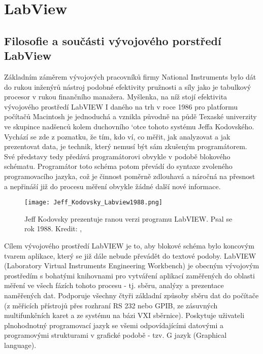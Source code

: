 \chapter{LabView}\label{ES:kap_labview}
\minitoc
\newpage
  \section{Filosofie a součásti vývojového porstředí LabView }
    Základním záměrem vývojových pracovníků firmy National Instruments bylo dát do rukou inženýrů
    nástroj podobné efektivity pružnosti a síly jako je tabulkový procesor v rukou finančního
    manažera. Myšlenka, na níž stojí efektivita vývojového prostředí LabVIEW I daného na trh v roce
    1986 pro platformu počítačů Macintosh je jednoduchá a vznikla původně na půdě Texaské univerzity
    ve skupince nadšenců kolem duchovního `otce tohoto systému Jeffa Kodovského. Vychází se zde z 
    poznatku, že tím, kdo ví, co měřit, jak analyzovat a jak prezentovat data, je technik, který
    nemusí být sám zkušeným programátorem. Své představy tedy předává programátorovi obvykle v
    podobě blokového schématu. Programátor toto schéma potom převádí do syntaxe zvoleného
    programovacího jazyka, což je činnost poměrně zdlouhavá a náročná na přesnost a nepřináší již do
    procesu měření obvykle žádné další nové informace.
     
    \begin{wrapfigure}{r}{8cm}
      \centering
      \texttt{[image: Jeff\_Kodovsky\_Labview1988.png]}
      \caption{Jeff Kodovsky prezentuje ranou verzi programu LabVIEW. Psal se rok 1988. Kredit:
               \niLabviewHistory, \cite{Kodovsky2011}}
      \label{ems:fig_Kodovsky}
   \end{wrapfigure}
    Cílem vývojového prostředí LabVIEW je to, aby blokové schéma bylo koncovým tvarem aplikace,
    který se již dále nebude převádět do textové podoby. LabVIEW (Laboratory Virtual Instruments
    Engineering Workbench) je obecným vývojovým prostředím s bohatými knihovnami pro vytváření
    aplikací zaměřených do oblasti měření ve všech fázích tohoto procesu - tj. sběru, analýzy a
    prezentace naměřených dat. Podporuje všechny čtyři základní způsoby sběru dat do počítače (z
    měřicích přístrojů přes rozhraní RS 232 nebo GPIB, ze zásuvných multifunkčních karet a ze
    systému na bázi VXI sběrnice). Poskytuje uživateli plnohodnotný programovací jazyk se všemi
    odpovídajícími datovými a programovými strukturami v grafické podobě - tzv. G jazyk (Graphical
    language)\cite[p.~21]{Zidek-2002-ID60}.

